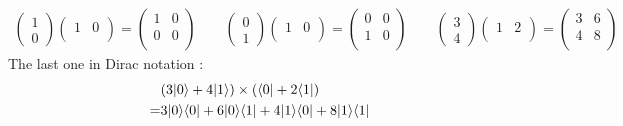 \documentclass[12pt]{article}
\theoremstyle{exostyle}
\begin{document}
\begin{align*}
\left(\begin{array}{c}
 1\\
 0
\end{array}\right)
\left(\begin{array}{cccc}
 1 &0 \\
\end{array}\right)
=
\left(\begin{array}{cccc}
 1 &0 \\
 0 &0 \\
\end{array}\right)
\qquad
\left(\begin{array}{c}
 0\\
 1
\end{array}\right)
\left(\begin{array}{cccc}
 1 &0 \\
\end{array}\right)
=
\left(\begin{array}{cccc}
 0 &0 \\
 1 &0 \\
\end{array}\right)
\qquad
\left(\begin{array}{c}
 3\\
 4
\end{array}\right)
\left(\begin{array}{cccc}
 1 &2 \\
\end{array}\right)
=
\left(\begin{array}{cccc}
 3 &6 \\
 4 &8 \\
\end{array}\right)
\end{align*}
The last one in Dirac notation :
\begin{align*}
  & (3| 0 \rangle + 4| 1 \rangle) \times (\langle 0 | + 2\langle 1 |) \\
  =& 3 | 0 \rangle \langle 0 | + 6 | 0 \rangle \langle 1 | + 4 | 1 \rangle \langle 0 | + 8 | 1 \rangle \langle 1 |
\end{align*}
\end{document}

